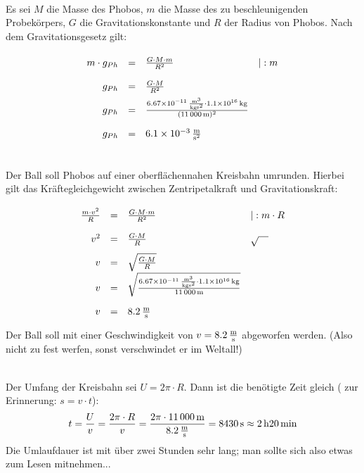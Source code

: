 \documentclass[a4paper]{article}
\begin{document}
\vspace{0.5 cm}

\\
Es sei $M$ die Masse des Phobos, $m$ die Masse des zu beschleunigenden Probekörpers, $G$ die Gravitationskonstante und $R$ der Radius von Phobos. Nach dem Gravitationsgesetz gilt:
$$
\renewcommand{\arraystretch}{2}
\begin{array}{rcll}
m\cdot g_{Ph} & = & { G \cdot M \cdot m \over R^2} & | :m \\
       g_{Ph} & = & { G \cdot M \over R^2} \\
       g_{Ph} & = & { \SI{6,67e-11}{{\meter^3} \over {\kilogram\second^2}} \cdot \SI{1,1e16}{\kilogram} \over (\SI{11000}{\meter})^2} \\
       g_{Ph} & = & \SI{6,1e-3}{\meter \over{ \second^2}}
\end{array}
$$ 
\vspace{0.5 cm}

\\
Der Ball soll Phobos auf einer oberflächennahen Kreisbahn umrunden. Hierbei gilt das Kräftegleichgewicht zwischen Zentripetalkraft und Gravitationskraft:
$$
\renewcommand{\arraystretch}{2}
\begin{array}{rcll}
{m\cdot v^2 \over R} & = & { G \cdot M \cdot m \over R^2} & | :m \cdot R\\
v^2 & = & { G \cdot M \over R} & \sqrt{\quad}\\
  v & = & \sqrt{ G \cdot M \over R} \\
  v & = & \sqrt{ \SI{6,67e-11}{{\meter^3} \over {\kilogram\second^2}} \cdot \SI{1,1e16}{\kilogram} \over \SI{11000}{\meter}} \\
  v & = & \SI{8,2}{\meter \over \second}
\end{array}
$$ 
Der Ball soll mit einer Geschwindigkeit von $v=\SI{8,2}{\meter \over \second}$ abgeworfen werden. (Also nicht zu fest werfen, sonst verschwindet er im Weltall!)
\vspace{0.5 cm}

\\
Der Umfang der Kreisbahn sei $U = 2 \pi \cdot R$. Dann ist die benötigte Zeit gleich ( zur Erinnerung: $s=v\cdot t$):
$$t = {U \over v}= {2 \pi \cdot R \over v} = {2 \pi \cdot \SI{11000}{\meter} \over \SI{8,2}{\meter \over \second}}= \SI{8430}{\second} \approx \SI{2}{\hour}\SI{20}{\minute}$$
Die Umlaufdauer ist mit über zwei Stunden sehr lang; man sollte sich also etwas zum Lesen mitnehmen...
\end{document}

